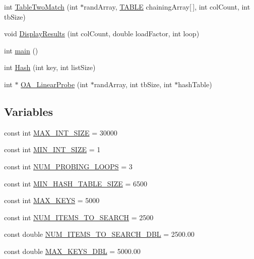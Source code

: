 \begin{DoxyCompactItemize}
\item 
int \hyperlink{_bradshaw-_mansfield-_assn2-_d_l_l_prog_8cpp_ac3b1f2ded03ac311b3797a7f3c63e9ae}{TableTwoMatch} (int $\ast$randArray, \hyperlink{struct_t_a_b_l_e}{TABLE} chainingArray\mbox{[}$\,$\mbox{]}, int colCount, int tbSize)
\item 
void \hyperlink{_bradshaw-_mansfield-_assn2-_d_l_l_prog_8cpp_a836159c17ba22cc964bdb78a64ed7c3b}{DisplayResults} (int colCount, double loadFactor, int loop)
\item 
int \hyperlink{_bradshaw-_mansfield-_assn2-_d_l_l_prog_8cpp_ae66f6b31b5ad750f1fe042a706a4e3d4}{main} ()
\item 
int \hyperlink{_bradshaw-_mansfield-_assn2-_d_l_l_prog_8cpp_ae9957e8e2a204d621e9f9cc2999adf56}{Hash} (int key, int listSize)
\item 
int $\ast$ \hyperlink{_bradshaw-_mansfield-_assn2-_d_l_l_prog_8cpp_aa342d426f7a6fa643a100ba04bc8e46e}{OA\_\-LinearProbe} (int $\ast$randArray, int tbSize, int $\ast$hashTable)
\end{DoxyCompactItemize}
\subsection*{Variables}
\begin{DoxyCompactItemize}
\item 
const int \hyperlink{_bradshaw-_mansfield-_assn2-_d_l_l_prog_8cpp_a80697a51c12117a5eae4ada58d27e1c2}{MAX\_\-INT\_\-SIZE} = 30000
\item 
const int \hyperlink{_bradshaw-_mansfield-_assn2-_d_l_l_prog_8cpp_a2e30ee6cd6a71066a4c99da7204c73bd}{MIN\_\-INT\_\-SIZE} = 1
\item 
const int \hyperlink{_bradshaw-_mansfield-_assn2-_d_l_l_prog_8cpp_ac3e309d0e80c3dd569ed3cfb701075a8}{NUM\_\-PROBING\_\-LOOPS} = 3
\item 
const int \hyperlink{_bradshaw-_mansfield-_assn2-_d_l_l_prog_8cpp_a92e00f871716652e494af2741a4794bd}{MIN\_\-HASH\_\-TABLE\_\-SIZE} = 6500
\item 
const int \hyperlink{_bradshaw-_mansfield-_assn2-_d_l_l_prog_8cpp_ad2624222b2a41e40f795baff70c1d20c}{MAX\_\-KEYS} = 5000
\item 
const int \hyperlink{_bradshaw-_mansfield-_assn2-_d_l_l_prog_8cpp_a02ce5f32cab205c8455bd8b976085c50}{NUM\_\-ITEMS\_\-TO\_\-SEARCH} = 2500
\item 
const double \hyperlink{_bradshaw-_mansfield-_assn2-_d_l_l_prog_8cpp_ad619de5a53a38d732b9c5da01523a23e}{NUM\_\-ITEMS\_\-TO\_\-SEARCH\_\-DBL} = 2500.00
\item 
const double \hyperlink{_bradshaw-_mansfield-_assn2-_d_l_l_prog_8cpp_a3a0ca86f28ff2c4d31143f5f3d6ca40a}{MAX\_\-KEYS\_\-DBL} = 5000.00
\end{DoxyCompactItemize}



